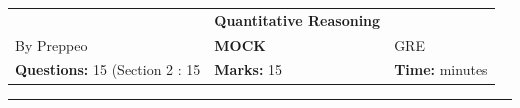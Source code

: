 \documentclass[11pt,paper=a4,answers]{exam}
\begin{document}
\begin{center}
    \centering
    \renewcommand{\arraystretch}{1.5}
    \begin{tabularx}{\textwidth}{YYY}
    & \normalsize\bf{{\Large{{Quantitative Reasoning}}}} & \\
    By Preppeo & \normalsize\bf{MOCK } & GRE\\
    \normalsize{\textbf{Questions:} 15 (Section 2 : 15} & \normalsize{\textbf{Marks:} 15 } & \normalsize{\textbf{Time:}  minutes } \\
    \end{tabularx}
\end{center}
\par\noindent\rule{\textwidth}{1pt}
\end{document}
